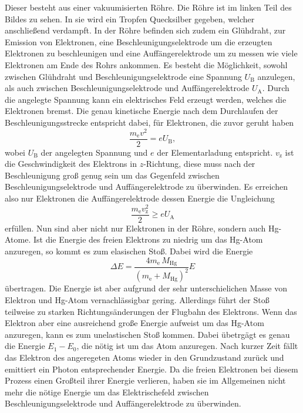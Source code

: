 Dieser besteht aus einer vakuumisierten Röhre.
Die Röhre ist im linken Teil des Bildes zu sehen.
In sie wird ein Tropfen Quecksilber gegeben, welcher anschließend verdampft.
In der Röhre befinden sich zudem ein Glühdraht, zur Emission von Elektronen, eine Beschleunigungselektrode um die erzeugten Elektronen zu beschleunigen und eine Auffängerelektrode um zu messen wie viele Elektronen am Ende des Rohrs ankommen.
Es besteht die Möglichkeit, sowohl zwischen Glühdraht und Beschleunigungselektrode eine Spannung $U_\text{B}$ anzulegen, als auch zwischen Beschleunigungselektrode und Auffängerelektrode $U_\text{A}$.
Durch die angelegte Spannung kann ein elektrisches Feld erzeugt werden, welches die Elektronen bremst.
Die genau kinetische Energie nach dem Durchlaufen der Beschleunigungsstrecke entspricht dabei, für Elektronen, die zuvor geruht haben
\begin{equation}
    \frac{m_\text{e} v^2}{2} = eU_\text{B},
    \label{eq:Energieelek}
\end{equation}
wobei $U_\text{B}$ der angelegten Spannung und $e$ der Elementarladung entspricht.
$v_\text{z}$ ist die Geschwindigkeit des Elektrons in $z$-Richtung, diese muss nach der Beschleunigung groß genug sein um das Gegenfeld zwischen Beschleunigungselektrode und Auffängerelektrode zu überwinden.
Es erreichen also nur Elektronen die Auffängerelektrode dessen Energie die Ungleichung
\begin{equation*}
    \frac{m_\text{e} v_\text{z}^2}{2} \geq eU_\text{A} 
\end{equation*}
erfüllen.
Nun sind aber nicht nur Elektronen in der Röhre, sondern auch Hg-Atome.
Ist die Energie des freien Elektrons zu niedrig um das Hg-Atom anzuregen, so kommt es zum elasischen Stoß.
Dabei wird die Energie 
\begin{equation*}
    \Delta E = \frac{4m_\text{e}\, M_\text{Hg}}{\left (m_\text{e} + M_\text{Hg} \right )^2} E
\end{equation*}
übertragen.
Die Energie ist aber aufgrund der sehr unterschielichen Masse von Elektron und Hg-Atom vernachlässigbar gering.
Allerdings führt der Stoß teilweise zu starken Richtungsänderungen der Flugbahn des Elektrons.
Wenn das Elektron aber eine ausreichend große Energie aufweist um das Hg-Atom anzuregen, kann es zum unelastischen Stoß kommen.
Dabei übetrgägt es genau die Energie $E_1 - E_0$, die nötig ist um das Atom anzuregen.
Nach kurzer Zeit fällt das Elektron des angeregeten Atoms wieder in den Grundzustand zurück und emittiert ein Photon entsprechender Energie.
Da die freien Elektronen bei diesem Prozess einen Großteil ihrer Energie verlieren, haben sie im Allgemeinen nicht mehr die nötige Energie um das Elektrischefeld zwischen Beschleunigungselektrode und Auffängerelektrode zu überwinden.
